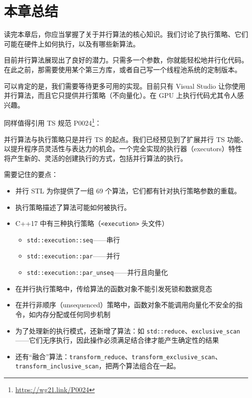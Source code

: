 \section{本章总结}

读完本章后，你应当掌握了关于并行算法的核心知识。我们讨论了执行策略、它们可能在硬件上如何执行，以及有哪些新算法。

目前并行算法展现出了良好的潜力。只需多一个参数，你就能轻松地并行化代码。在此之前，那需要使用某个第三方库，或者自己写一个线程池系统的定制版本。

可以肯定的是，我们需要等待更多可用的实现。目前只有 Visual Studio 让你使用并行算法，而且它只提供并行策略（不向量化）。在 GPU 上执行代码尤其令人感兴趣。

同样值得引用 TS 规范 P0024\footnote{\url{https://wg21.link/P0024}}：

\begin{myQuote}
并行算法与执行策略只是并行 TS 的起点。我们已经预见到了扩展并行 TS 功能、以提升程序员灵活性与表达力的机会。一个完全实现的执行器（executors）特性将产生新的、灵活的创建执行的方式，包括并行算法的执行。
\end{myQuote}

需要记住的要点：
\begin{itemize}
\item 并行 STL 为你提供了一组 69 个算法，它们都有针对执行策略参数的重载。
\item 执行策略描述了算法可能如何被执行。
\item C++17 中有三种执行策略（\texttt{<execution>} 头文件）
  \begin{itemize}
  \item \texttt{std::execution::seq}——串行
  \item \texttt{std::execution::par}——并行
  \item \texttt{std::execution::par\_unseq}——并行且向量化
  \end{itemize}
\item 在并行执行策略中，传给算法的函数对象不能引发死锁和数据竞态
\item 在并行非顺序（unsequenced）策略中，函数对象不能调用向量化不安全的指令，如内存分配或任何同步机制
\item 为了处理新的执行模式，还新增了算法：如 \texttt{std::reduce}、\texttt{exclusive\_scan}——它们无序执行，因此操作必须满足结合律才能产生确定性的结果
\item 还有“融合”算法：\texttt{transform\_reduce}、\texttt{transform\_exclusive\_scan}、\texttt{transform\_inclusive\_scan}，把两个算法组合在一起。
\end{itemize}


